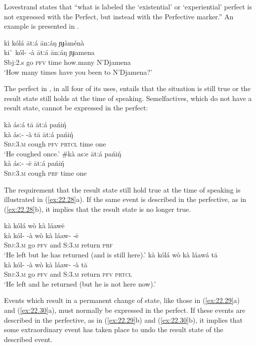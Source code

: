 Lovestrand states that “what is labeled the ‘existential’ or ‘experiential’ perfect is not expressed with the Perfect, but instead with the Perfective marker.” An example is presented in .


\ea \label{ex:22.26}
\glll kì  kólá  {}  ātːá  ānːáŋ  ɲɟàménà\\
ki\`{}   kól-  -à  ātːá  ānːáŋ  ɲɟamena\\
Sbj:2.s  go  \textsc{pfv}  time  how.many  N’Djamena\\
\glt ‘How many times have you been to N’Djamena?’
\z


The perfect in , in all four of its uses, entails that the situation is still true or the result state still holds at the time of speaking. Semelfactives, which do not have a result state, cannot be expressed in the perfect:


\ea \label{ex:22.27}
\ea \glll  kà  ásːá  {}  tā  ātːá  pańiŋ́ \\
kà  ásː-  -à  tā  ātːá  pańiŋ́ \\
\textsc{Sbj:3.m}  cough  \textsc{pfv}  \textsc{prtcl}  time  one\\
\glt ‘He coughed once.’
\ex \glll  \#kà  asːe  {}  ātːá  pańiŋ́ \\ 
  kà  ásː-  -ē  ātːá  pańiŋ́ \\
\textsc{Sbj:3.m}  cough  \textsc{prf}  time  one\\
\z \z


The requirement that the result state still hold true at the time of speaking is illustrated in (\ref{ex:22.28}a). If the same event is described in the perfective, as in (\ref{ex:22.28}b), it implies that the result state is no longer true.


\ea \label{ex:22.28}
\ea  \glll kà  kólá  {}  wò  kà  láawē\\
kà  kól-  -à  wò  kà  láaw-  -ē\\
\textsc{Sbj:3.m}  go  \textsc{pfv}  and  \textsc{S:3.m}  return  \textsc{prf}\\
\glt ‘He left but he has returned (and is still here).’
\ex \glll   kà  kólá  {}  wò  kà  láawá  {}  tā\\
kà  kól-  -à  wò  kà  láaw-  -à  tā\\
\textsc{Sbj:3.m}  go  \textsc{pfv}  and  \textsc{S:3.m}  return  \textsc{pfv}  \textsc{prtcl}\\
\glt ‘He left and he returned (but he is not here now).’
\z \z


Events which result in a permanent change of state, like those in (\ref{ex:22.29}a) and (\ref{ex:22.30}a), must normally be expressed in the perfect. If these events are described in the perfective, as in (\ref{ex:22.29}b) and (\ref{ex:22.30}b), it implies that some extraordinary event has taken place to undo the result state of the described event.


